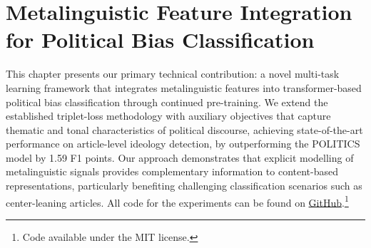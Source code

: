 \chapter{Metalinguistic Feature Integration for Political Bias Classification}
\label{sec:continued-pretraining}

This chapter presents our primary technical contribution: a novel multi-task learning framework that integrates metalinguistic features into transformer-based political bias classification through continued pre-training. We extend the established triplet-loss methodology with auxiliary objectives that capture thematic and tonal characteristics of political discourse, achieving state-of-the-art performance on article-level ideology detection, by outperforming the POLITICS model by 1.59 F1 points. Our approach demonstrates that explicit modelling of metalinguistic signals provides complementary information to content-based representations, particularly benefiting challenging classification scenarios such as center-leaning articles. All code for the experiments can be found on \href{https://github.com/upasanachatterjee/metalinguistic_features_in_political_bias_detection}{GitHub}.\footnote{Code available under the MIT license.}

